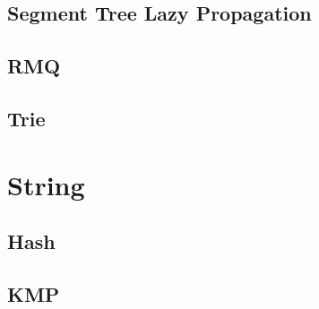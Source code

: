 \documentclass[a4paper,landscape]{article}
\begin{document}
\begin{multicols}{2}
\subsection{Segment Tree Lazy Propagation}
	
\subsection{RMQ}
	
\subsection{Trie}
	


\section{String}
\subsection{Hash}
	
\subsection{KMP}
	

\end{multicols}
\end{document}
